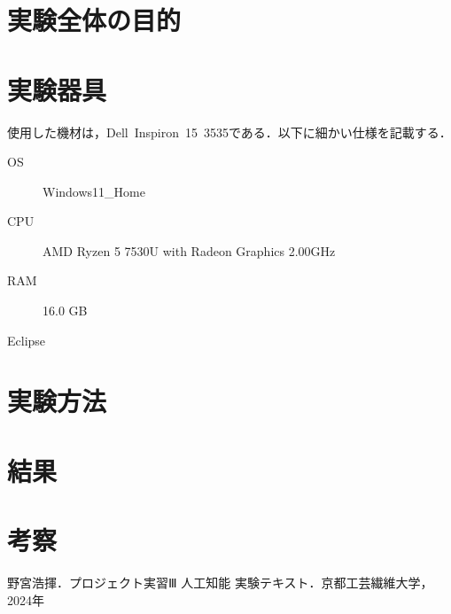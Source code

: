 \documentclass{jlreq}
\numberwithin{equation}{section}
\begin{document}
\tableofcontents
\clearpage

\section{実験全体の目的}
\section{実験器具}
使用した機材は，Dell\ Inspiron\ 15\ 3535である．以下に細かい仕様を記載する．

\begin{description}
  \item[OS] Windows11\_Home
  \item[CPU] AMD Ryzen 5 7530U with Radeon Graphics 2.00GHz
  \item[RAM] 16.0 GB
  \item[Eclipse] 
\end{description}

\section{実験方法}

\section{結果}

\section{考察}

\begin{thebibliography}{9}
  \item 野宮浩揮．プロジェクト実習Ⅲ 人工知能 実験テキスト．京都工芸繊維大学，2024年
\end{thebibliography}
\end{document}
